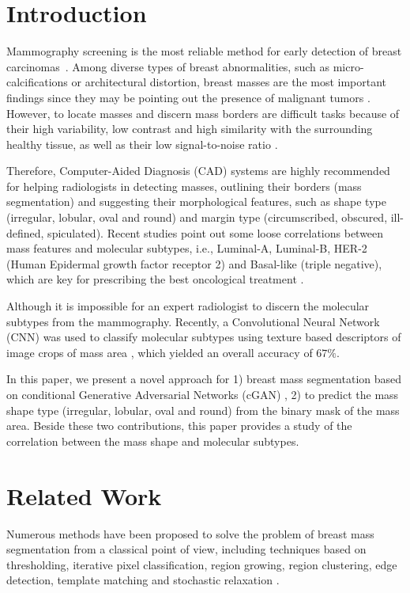 \documentclass[runningheads,a4paper]{llncs}
\begin{document}
\section{Introduction}

Mammography screening is the most reliable method for early detection of breast carcinomas~\cite{ChengSMHCD06}. Among diverse types of breast abnormalities, such as micro-calcifications or architectural distortion, breast masses are the most important findings since they may be pointing out the presence of malignant tumors \cite{kopans1998}. However, to locate masses and discern mass borders are difficult tasks because of their high variability, low contrast and high similarity with the surrounding healthy tissue, as well as their low signal-to-noise ratio \cite{elmore2009}.

Therefore, Computer-Aided Diagnosis (CAD) systems are highly recommended for helping radiologists in detecting masses, outlining their borders (mass segmentation) and suggesting their morphological features, such as shape type (irregular, lobular, oval and round) and margin type (circumscribed, obscured, ill-defined, spiculated).
Recent studies point out some loose correlations between mass features and molecular subtypes, i.e., Luminal-A, Luminal-B, HER-2 (Human Epidermal growth factor receptor 2) and Basal-like (triple negative), which are key for prescribing the best oncological treatment \cite{cho2016,liu2016,tamaki2011}.

Although it is impossible for an expert radiologist to discern the molecular subtypes from the mammography. Recently, a Convolutional Neural Network (CNN) was used to classify molecular subtypes using texture based descriptors of image crops of mass area \cite{Singh17CCIA}, which yielded an overall accuracy of $67\%$.

In this paper, we present a novel approach for 1) breast mass segmentation based on conditional Generative Adversarial Networks (cGAN) \cite{isola2017image}, 2) to predict the mass shape type (irregular, lobular, oval and round) from the binary mask of the mass area. Beside these two contributions, this paper provides a study of the correlation between the mass shape and molecular subtypes.

\section{Related Work}

Numerous methods have been proposed to solve the problem of breast mass segmentation from a classical point of view, including techniques based on thresholding, iterative pixel classification, region growing, region clustering, edge detection, template matching and stochastic relaxation \cite{ChengSMHCD06,oliver2010review}.
\end{document}
